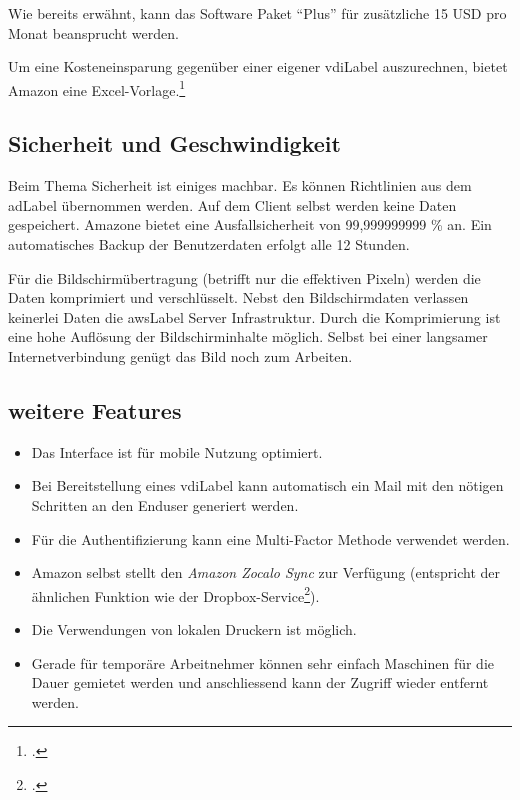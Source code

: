 Wie bereits erwähnt, kann das Software Paket "`Plus"' für zusätzliche 15 USD pro Monat beansprucht werden.

Um eine Kosteneinsparung gegenüber einer eigener \Gls{vdiLabel} auszurechnen, bietet Amazon eine Excel-Vorlage.\footcite{TCO_Comparison_Amazon_WorkSpaces_and_Traditional_Virtual_Desktop_Infrastructure_VDI_2014-11-15}

\subsection{Sicherheit und Geschwindigkeit}
Beim Thema Sicherheit ist einiges machbar.
Es können Richtlinien aus dem \Gls{adLabel} übernommen werden.
Auf dem Client selbst werden keine Daten gespeichert.
Amazone bietet eine Ausfallsicherheit von 99,999999999 \% an.
Ein automatisches Backup der Benutzerdaten erfolgt alle 12 Stunden.

Für die Bildschirmübertragung (betrifft nur die effektiven Pixeln) werden die Daten komprimiert und verschlüsselt.
Nebst den Bildschirmdaten verlassen keinerlei Daten die \Gls{awsLabel} Server Infrastruktur.
Durch die Komprimierung ist eine hohe Auflösung der Bildschirminhalte möglich. Selbst bei einer langsamer Internetverbindung genügt das Bild noch zum Arbeiten.

\subsection{weitere Features}
\begin{itemize}
	\item Das Interface ist für mobile Nutzung optimiert.
	\item Bei Bereitstellung eines \Gls{vdiLabel} kann automatisch ein Mail mit den nötigen Schritten an den Enduser generiert werden.
	\item Für die Authentifizierung kann eine Multi-Factor Methode verwendet werden.
	\item Amazon selbst stellt den \textit{Amazon Zocalo Sync} zur Verfügung (entspricht der ähnlichen Funktion wie der Dropbox-Service\footcite{Dropbox_2014-11-15}).
	\item Die Verwendungen von lokalen Druckern ist möglich.
	\item Gerade für temporäre Arbeitnehmer können sehr einfach Maschinen für die Dauer gemietet werden und anschliessend kann der Zugriff wieder entfernt werden.
\end{itemize}

